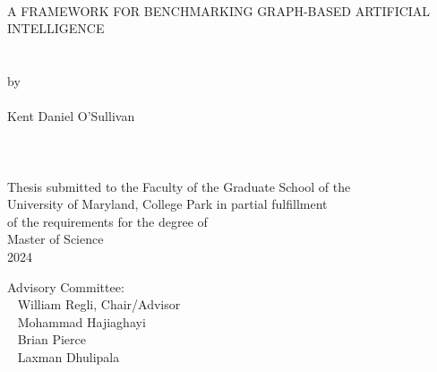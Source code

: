 
\thispagestyle{empty} \hbox{\ } \vspace{1.5in}
\renewcommand{\baselinestretch}{1}
\small\normalsize
\begin{center}

\large{{A FRAMEWORK FOR BENCHMARKING GRAPH-BASED ARTIFICIAL INTELLIGENCE}}\\
\ \\
\ \\
\large{by} \\
\ \\
\large{Kent Daniel O'Sullivan}%
\ \\
\ \\
\ \\
\ \\
\normalsize
Thesis submitted to the Faculty of the Graduate School of the \\
University of Maryland, College Park in partial fulfillment \\
of the requirements for the degree of \\
Master of Science \\
2024
\end{center}

\vspace{7.5em}

\noindent Advisory Committee: \\
\hbox{\ }\hspace{.5in} William Regli, Chair/Advisor \\
\hbox{\ }\hspace{.5in} Mohammad Hajiaghayi \\
\hbox{\ }\hspace{.5in} Brian Pierce \\
\hbox{\ }\hspace{.5in} Laxman Dhulipala\\


